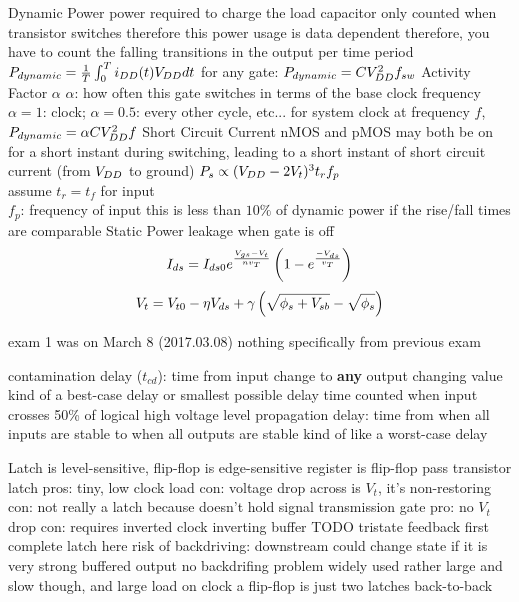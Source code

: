 \documentclass[12pt]{article}
\begin{document}
\begin{spacing}{0.8}
\begin{multicols*}{2}
\begin{flushleft}
\begin{outline}[longenum]
  \1 Dynamic Power
    \2 power required to charge the load capacitor
    \2 only counted when transistor switches
      \3 therefore this power usage is data dependent
      \3 therefore, you have to count the falling transitions in the output per time period
    \2 $P_{dynamic} = \frac{1}{T}\int_0^T i_{DD}(t) V_{DD} dt$
    \2 for any gate: $P_{dynamic} = C V_{DD}^2 f_{sw}$
  \1 Activity Factor $\alpha$
    \2 $\alpha$: how often this gate switches in terms of the base clock frequency
    \2 $\alpha=1$: clock; $\alpha=0.5$: every other cycle, etc...
    \2 for system clock at frequency $f$, $P_{dynamic} = \alpha C V_{DD}^2 f$
  \1 Short Circuit Current
    \2 nMOS and pMOS may both be on for a short instant during switching, leading to a short instant of short circuit current (from $V_{DD}$ to ground)
    \2 $P_s \propto (V_{DD} -2V_t)^3 t_r f_p$
      \\ assume $t_r=t_f$ for input
      \\ $f_p$: frequency of input
    \2 this is less than $10\%$ of dynamic power if the rise/fall times are comparable
  \1 Static Power
    \2 leakage when gate is off
    \2 
    $$ I_{ds} = I_{ds0} e^{\frac{V_{gs}-V_{t}}{nv_T}} \left( 1 - e^{\frac{-V_{ds}}{v_T}} \right) $$
    $$ V_t = V_{t0} - \eta V_{ds} + \gamma \left( \sqrt{\phi_s + V_{sb}} - \sqrt{\phi_s} \right) $$


    







  \1 exam 1 was on March 8 (2017.03.08)
  \1 nothing specifically from previous exam

  \1 contamination delay ($t_{cd}$): time from input change to \textbf{any} output changing value
    \2 kind of a best-case delay or smallest possible delay
    \2 time counted when input crosses 50\% of logical high voltage level
  \1 propagation delay: time from when all inputs are stable to when all outputs are stable
    \2 kind of like a worst-case delay

  \1 Latch is level-sensitive, flip-flop is edge-sensitive
  \1 register is flip-flop
  \1 pass transistor latch
    \2 pros: tiny, low clock load
    \2 con: voltage drop across is $V_t$, it's non-restoring
    \2 con: not really a latch because doesn't hold signal
  \1 transmission gate
    \2 pro: no $V_t$ drop
    \2 con: requires inverted clock
  \1 inverting buffer
    \2 TODO
  \1 tristate feedback
    \2 first complete latch here
    \2 risk of backdriving: downstream could change state if it is very strong
  \1 buffered output
    \2 no backdrifing problem
    \2 widely used
    \2 rather large and slow though, and large load on clock
  \1 a flip-flop is just two latches back-to-back


\end{outline}
\end{flushleft}
\end{multicols*}
\end{spacing}
\end{document}
